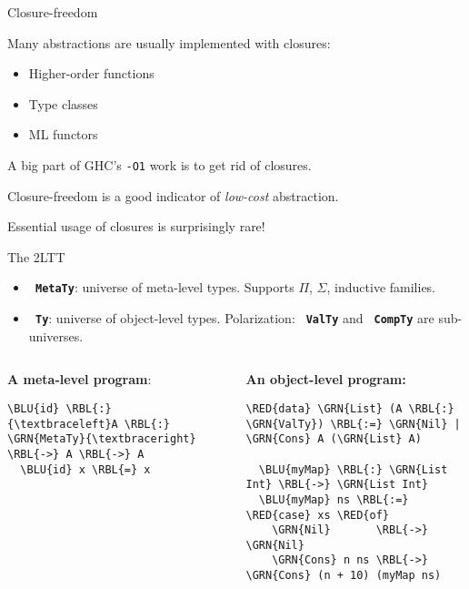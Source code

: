 \documentclass[dvipsnames,aspectratio=169]{beamer}
\newcommand{\ttt}[1]{{\texttt{#1}}}
\theoremstyle{remark}
\newcommand{\RED}[1]{{\color{BrickRed} #1}}
\newcommand{\GRN}[1]{{\color{OliveGreen} #1}}
\newcommand{\RBL}[1]{{\color{RoyalBlue} #1}}
\newcommand{\BLU}[1]{{\color{Blue} #1}}
\begin{document}
\begin{frame}[fragile]{Closure-freedom}


Many abstractions are usually implemented with closures:
  \begin{itemize}
    \item Higher-order functions
    \item Type classes
    \item ML functors
  \end{itemize}
\vspace{1em}

A big part of GHC's \texttt{-O1} work is to get rid of closures.
\vspace{1em}

Closure-freedom is a good indicator of \emph{low-cost} abstraction.
\vspace{1em}

Essential usage of closures is surprisingly rare!


\end{frame}

\begin{frame}[fragile]{The 2LTT}

\begin{itemize}
  \item \textbf{\ttt{\GRN{MetaTy}}}: universe of meta-level types. Supports $\Pi$, $\Sigma$, inductive families.
  \item \textbf{\ttt{\GRN{Ty}}}: universe of object-level types. \alert{Polarization}:
    \textbf{\ttt{\GRN{ValTy}}} and \textbf{\ttt{\GRN{CompTy}}} are sub-universes.
\end{itemize}
\vspace{2em}

\begin{columns}
\begin{column}{0.4\textwidth}
\textbf{A meta-level program}:
\begin{Verbatim}[commandchars=\\\{\}]
  \BLU{id} \RBL{:} {\textbraceleft}A \RBL{:} \GRN{MetaTy}{\textbraceright} \RBL{->} A \RBL{->} A
  \BLU{id} x \RBL{=} x




\end{Verbatim}
\end{column}

\begin{column}{0.6\textwidth}
\textbf{An object-level program:}
\begin{Verbatim}[commandchars=\\\{\}]
  \RED{data} \GRN{List} (A \RBL{:} \GRN{ValTy}) \RBL{:=} \GRN{Nil} | \GRN{Cons} A (\GRN{List} A)

  \BLU{myMap} \RBL{:} \GRN{List Int} \RBL{->} \GRN{List Int}
  \BLU{myMap} ns \RBL{:=} \RED{case} xs \RED{of}
    \GRN{Nil}       \RBL{->} \GRN{Nil}
    \GRN{Cons} n ns \RBL{->} \GRN{Cons} (n + 10) (myMap ns)
\end{Verbatim}
\end{column}
\end{columns}


\end{frame}
\end{document}
